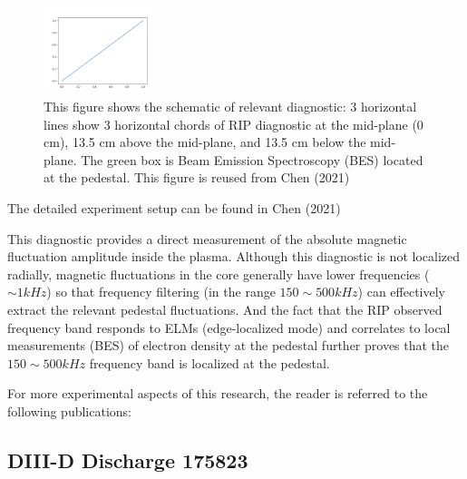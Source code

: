 \documentclass[
 aip,
 amsmath,amssymb,
 reprint
]{revtex4-1}
\begin{document}
\begin{figure}[ht]
        \includegraphics[width=0.3\textwidth]{1.png}
        \centering
        \caption[font=5]{This figure shows the schematic of relevant diagnostic: 
        3 horizontal lines show 3 horizontal chords of RIP diagnostic at the mid-plane (0 cm), 13.5 cm above the mid-plane, and 13.5 cm below the mid-plane. 
        The green box is Beam Emission Spectroscopy (BES) located at the pedestal. 
        This figure is reused from Chen (2021) \cite{RIP_Chen_POP_2021}}
        \label{fig:RIP}
\end{figure}

The detailed experiment setup can be found in Chen (2021)\cite{RIP_Chen_POP_2021}

This diagnostic provides a direct measurement of the absolute magnetic fluctuation amplitude inside the plasma. Although this diagnostic is not localized radially, magnetic fluctuations in the core generally have lower frequencies ($\sim1kHz$) so that frequency filtering (in the range $150\sim 500 kHz$) can effectively extract the relevant pedestal fluctuations. And the fact that the RIP observed frequency band responds to ELMs (edge-localized mode) and correlates to local measurements (BES) of electron density at the pedestal further proves that the $150\sim 500 kHz$ frequency band is localized at the pedestal.\cite{RIP_Chen_POP_2021} 

For more experimental aspects of this research, the reader is referred to the following publications: \cite{rip,RIP_Chen_POP_2021,RIP_Chen_POP_2020} 

\subsection{DIII-D Discharge 175823}
\end{document}
